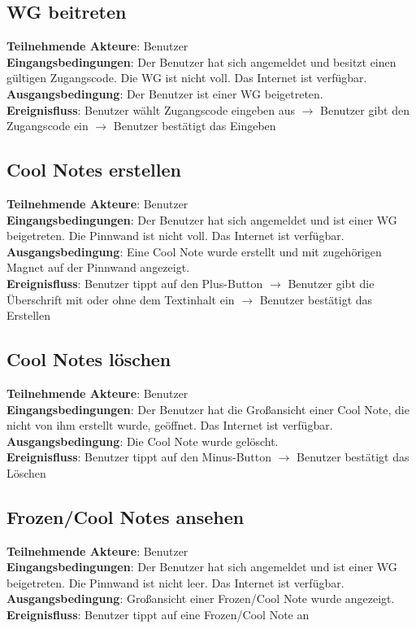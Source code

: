 \documentclass[a4paper]{scrreprt}
\begin{document}
		\subsection{WG beitreten}
		\textbf{Teilnehmende Akteure}: Benutzer \\
		\textbf{Eingangsbedingungen}: Der Benutzer hat sich angemeldet und besitzt einen gültigen Zugangscode. Die WG ist nicht voll. Das Internet ist verfügbar. \\
		\textbf{Ausgangsbedingung}: Der Benutzer ist einer WG beigetreten. \\
		\textbf{Ereignisfluss}: Benutzer wählt Zugangscode eingeben aus $\rightarrow$ Benutzer gibt den Zugangscode ein $\rightarrow$ Benutzer bestätigt das Eingeben
		
		\subsection{Cool Notes erstellen}
		\textbf{Teilnehmende Akteure}: Benutzer \\
		\textbf{Eingangsbedingungen}: Der Benutzer hat sich angemeldet und ist einer WG beigetreten. Die Pinnwand ist nicht voll. Das Internet ist verfügbar. \\
		\textbf{Ausgangsbedingung}: Eine Cool Note wurde erstellt und mit zugehörigen Magnet auf der Pinnwand angezeigt. \\
		\textbf{Ereignisfluss}: Benutzer tippt auf den Plus-Button $\rightarrow$ Benutzer gibt die Überschrift mit oder ohne dem Textinhalt ein $\rightarrow$ Benutzer bestätigt das Erstellen
		
		\subsection{Cool Notes löschen}
		\textbf{Teilnehmende Akteure}: Benutzer \\
		\textbf{Eingangsbedingungen}: Der Benutzer hat die Großansicht einer Cool Note, die nicht von ihm erstellt wurde, geöffnet. Das Internet ist verfügbar. \\
		\textbf{Ausgangsbedingung}: Die Cool Note wurde gelöscht. \\
		\textbf{Ereignisfluss}: Benutzer tippt auf den Minus-Button $\rightarrow$ Benutzer bestätigt das Löschen
		
		\subsection{Frozen/Cool Notes ansehen}
		\textbf{Teilnehmende Akteure}: Benutzer \\
		\textbf{Eingangsbedingungen}: Der Benutzer hat sich angemeldet und ist einer WG beigetreten. Die Pinnwand ist nicht leer. Das Internet ist verfügbar. \\
		\textbf{Ausgangsbedingung}: Großansicht einer Frozen/Cool Note wurde angezeigt. \\
		\textbf{Ereignisfluss}: Benutzer tippt auf eine Frozen/Cool Note an
		
\end{document}
